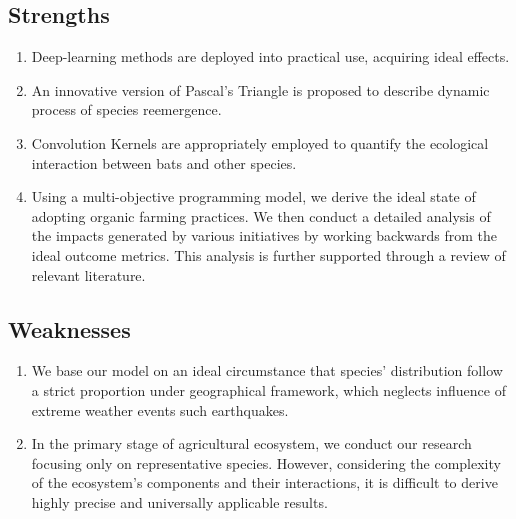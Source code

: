 \documentclass[12pt]{article}
\begin{document}
	\subsection{Strengths}
	\begin{enumerate}
		\item Deep-learning methods are deployed into practical use, acquiring ideal effects.
		\item An innovative version of Pascal's Triangle is proposed to describe dynamic process of species reemergence.
		\item Convolution Kernels are appropriately employed to quantify the ecological interaction between bats and other species. 
		\item Using a multi-objective programming model, we derive the ideal state of adopting organic farming practices. We then conduct a detailed analysis of the impacts generated by various initiatives by working backwards from the ideal outcome metrics. This analysis is further supported through a review of relevant literature.
	\end{enumerate}
	\subsection{Weaknesses}
	\begin{enumerate}
		\item We base our model on an ideal circumstance that species' distribution follow a strict proportion under geographical framework, which neglects influence of extreme weather events such earthquakes. 
		\item In the primary stage of agricultural ecosystem, we conduct our research focusing only on representative species. However, considering the complexity of the ecosystem's components and their interactions, it is difficult to derive highly precise and universally applicable results.
	\end{enumerate}
	
	
	
\end{document}
